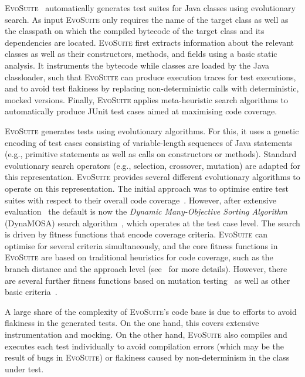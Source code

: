 \documentclass[sigconf]{acmart}
\newcommand{\EVOSUITE}{\textsc{EvoSuite}\xspace}
\begin{document}
\EVOSUITE~\cite{FrA11c} automatically generates test suites for Java classes
using evolutionary search. As input \EVOSUITE only requires the name of the
target class as well as the classpath on which the compiled bytecode of the
target class and its dependencies are located. \EVOSUITE first extracts
information about the relevant classes as well as their constructors, methods,
and fields using a basic static analysis. It instruments the bytecode while
classes are loaded by the Java classloader, such that \EVOSUITE can produce
execution traces for test executions, and to avoid test flakiness by replacing
non-deterministic calls with deterministic, mocked versions. Finally, \EVOSUITE
applies meta-heuristic search algorithms to automatically produce JUnit test
cases aimed at maximising code coverage.


\EVOSUITE generates tests using evolutionary algorithms. 
%
For this, it uses a genetic encoding of test cases consisting of variable-length sequences of Java statements (e.g., primitive statements as well as calls on constructors or methods). Standard evolutionary search operators (e.g., selection, crossover, mutation) are adapted for this representation. 
%
\EVOSUITE provides several different evolutionary algorithms to operate on this
representation. The initial approach was to optimise entire test suites with
respect to their overall code coverage~\cite{GoA_TSE12}. However, after
extensive evaluation~\cite{ea_evaluation} the default is now the
\emph{Dynamic Many-Objective Sorting Algorithm} (DynaMOSA) search
algorithm~\cite{dynamosa}, which operates at the test case level.
%
The search is driven by fitness functions that encode coverage criteria. \EVOSUITE can optimise for several criteria simultaneously, and the core fitness functions in \EVOSUITE are based on traditional heuristics for code coverage, such as the branch distance and the approach level (see~\cite{GoA_TSE12} for more details). However, there are several further fitness functions based on mutation testing~\cite{emse14_mutation} as well as other basic criteria~\cite{rojas2015combining}.


A large share of the complexity of \EVOSUITE's code base is due to efforts to
avoid flakiness in the generated tests. On the one hand, this covers extensive
instrumentation and mocking. On the other hand, \EVOSUITE also compiles and
executes each test individually to avoid compilation errors (which may be the
result of bugs in \EVOSUITE) or flakiness caused by non-determinism in the
class under test.
\end{document}
